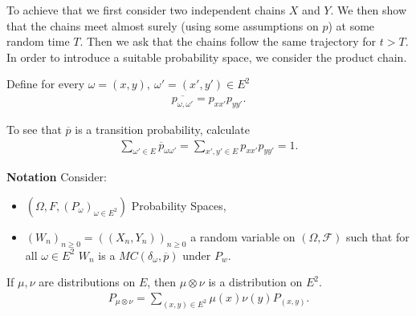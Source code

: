 To achieve that we first consider two independent chains $X$ and $Y$. We then show that the chains meet almost surely (using some assumptions on $p$) at some random time $T$. Then we ask that the chains follow the same trajectory for $t>T$. In order to introduce a suitable probability space, we consider the product chain.

\begin{defn}
	Define for every $\omega=(x,y), \ \omega'=(x',y') \in E^2$ 
	\begin{align}
	\boxed{\overline{p_{\omega, \omega'}}=p_{xx'}p_{yy'} }.
	\end{align}
\end{defn}
\begin{rmk}[]
	To see that $\overline{p}$ is a transition probability, calculate
	\begin{align}
		\sum_{\omega'\in E}^{} \overline{p}_{\omega \omega'} = \sum_{x',y' \in E}^{} p_{xx'}p_{yy'} = 1. 
	\end{align}
\end{rmk}


\noindent
\textbf{Notation} Consider:
\begin{itemize}
	\item $(\Omega, F, (P_\omega)_{\omega \in E^2})$ Probability Spaces,
	\item $(W_n)_{n\geq 0}=((X_n,Y_n))_{n\geq 0}$ a random variable on $(\Omega, \mathcal{F})$ such that for all $\omega \in E^2$ $W_n$ is a $MC(\delta_\omega, \overline{p})$ under $P_w$.
\end{itemize}

\begin{rmk}[]
	If $\mu, \nu $ are distributions on $E$, then $\mu \otimes \nu $ is a distribution on $E^2$.
	\begin{align}
		\boxed{P_{\mu \otimes \nu }= \sum_{(x,y)\in E^2}^{}\mu (x) \nu (y) P_{(x,y)}}.
	\end{align}
	
\end{rmk}

